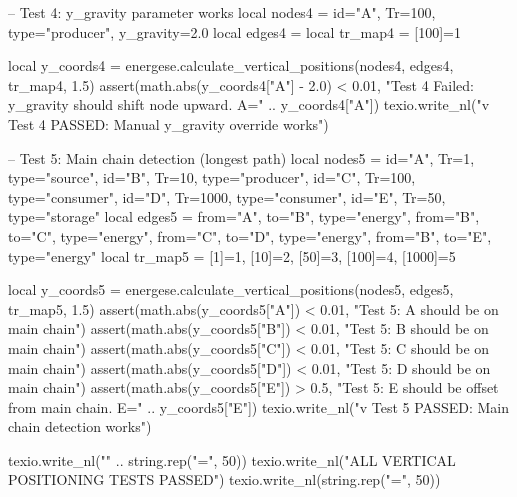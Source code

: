 \documentclass{article}
\begin{document}
\begin{luacode*}
    -- Test 4: y_gravity parameter works
    local nodes4 = {
        {id="A", Tr=100, type="producer", y_gravity=2.0}
    }
    local edges4 = {}
    local tr_map4 = { [100]=1 }

    local y_coords4 = energese.calculate_vertical_positions(nodes4, edges4, tr_map4, 1.5)
    assert(math.abs(y_coords4["A"] - 2.0) < 0.01,
           "Test 4 Failed: y_gravity should shift node upward. A=" .. y_coords4["A"])
    texio.write_nl("v Test 4 PASSED: Manual y_gravity override works")

    -- Test 5: Main chain detection (longest path)
    local nodes5 = {
        {id="A", Tr=1, type="source"},
        {id="B", Tr=10, type="producer"},
        {id="C", Tr=100, type="consumer"},
        {id="D", Tr=1000, type="consumer"},
        {id="E", Tr=50, type="storage"}
    }
    local edges5 = {
        {from="A", to="B", type="energy"},
        {from="B", to="C", type="energy"},
        {from="C", to="D", type="energy"},
        {from="B", to="E", type="energy"}
    }
    local tr_map5 = { [1]=1, [10]=2, [50]=3, [100]=4, [1000]=5 }

    local y_coords5 = energese.calculate_vertical_positions(nodes5, edges5, tr_map5, 1.5)
    assert(math.abs(y_coords5["A"]) < 0.01, "Test 5: A should be on main chain")
    assert(math.abs(y_coords5["B"]) < 0.01, "Test 5: B should be on main chain")
    assert(math.abs(y_coords5["C"]) < 0.01, "Test 5: C should be on main chain")
    assert(math.abs(y_coords5["D"]) < 0.01, "Test 5: D should be on main chain")
    assert(math.abs(y_coords5["E"]) > 0.5, "Test 5: E should be offset from main chain. E=" .. y_coords5["E"])
    texio.write_nl("v Test 5 PASSED: Main chain detection works")

    texio.write_nl("\n" .. string.rep("=", 50))
    texio.write_nl("ALL VERTICAL POSITIONING TESTS PASSED")
    texio.write_nl(string.rep("=", 50))
\end{luacode*}
\end{document}
